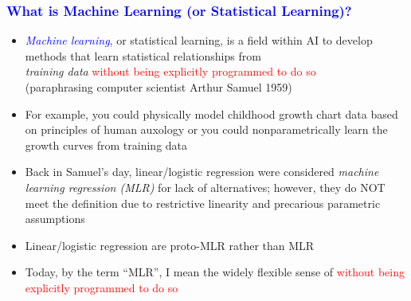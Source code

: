 \documentclass[11pt,dvipsnames,usenames,times]{beamer}
\newcommand*{\red}[1]{\textcolor{red}{#1}}%
\newcommand*{\blue}[1]{\textcolor{blue}{#1}}%
\begin{document}
\begin{frame}
\frametitle{\bf\textcolor{blue}{What is Machine Learning (or Statistical Learning)?}}
\boldmath

\begin{itemize}
\item \blue{\it Machine learning}, or statistical learning, is a field
  within AI 
to develop methods that {learn} statistical relationships from\\
  {\it training data} \red{without being explicitly programmed to do so}\\
 (paraphrasing computer scientist Arthur Samuel 1959)
\item For example, you could physically model childhood growth
  chart data based on principles of human auxology or you
  could nonparametrically learn the growth curves from training data
\item Back in Samuel's day, linear/logistic regression
  were considered {\it machine learning regression (MLR)} for lack of
  alternatives; however, they do NOT meet the definition
  due to restrictive linearity and precarious parametric assumptions
\item Linear/logistic regression are proto-MLR 
rather than MLR
\item Today, by the term ``MLR'', I mean the widely flexible sense
  of \red{without being explicitly programmed to do so}
\end{itemize}
\end{frame}
\end{document}

